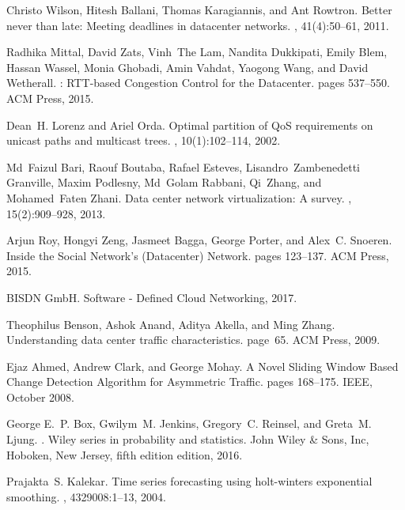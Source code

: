 \begin{thebibliography}{10}
Christo Wilson, Hitesh Ballani, Thomas Karagiannis, and Ant Rowtron.
\newblock Better never than late: {Meeting} deadlines in datacenter networks.
, 41(4):50--61, 2011.

Radhika Mittal, David Zats, Vinh~The Lam, Nandita Dukkipati, Emily Blem, Hassan
  Wassel, Monia Ghobadi, Amin Vahdat, Yaogong Wang, and David Wetherall.
: {RTT}-based {Congestion} {Control} for the {Datacenter}.
\newblock pages 537--550. ACM Press, 2015.

Dean~H. Lorenz and Ariel Orda.
\newblock Optimal partition of {QoS} requirements on unicast paths and
  multicast trees.
, 10(1):102--114, 2002.

Md~Faizul Bari, Raouf Boutaba, Rafael Esteves, Lisandro~Zambenedetti Granville,
  Maxim Podlesny, Md~Golam Rabbani, Qi~Zhang, and Mohamed~Faten Zhani.
\newblock Data center network virtualization: {A} survey.
, 15(2):909--928, 2013.

Arjun Roy, Hongyi Zeng, Jasmeet Bagga, George Porter, and Alex~C. Snoeren.
\newblock Inside the {Social} {Network}'s ({Datacenter}) {Network}.
\newblock pages 123--137. ACM Press, 2015.

{BISDN GmbH}.
\newblock Software - {Defined} {Cloud} {Networking}, 2017.

Theophilus Benson, Ashok Anand, Aditya Akella, and Ming Zhang.
\newblock Understanding data center traffic characteristics.
\newblock page~65. ACM Press, 2009.

Ejaz Ahmed, Andrew Clark, and George Mohay.
\newblock A {Novel} {Sliding} {Window} {Based} {Change} {Detection} {Algorithm}
  for {Asymmetric} {Traffic}.
\newblock pages 168--175. IEEE, October 2008.

George E.~P. Box, Gwilym~M. Jenkins, Gregory~C. Reinsel, and Greta~M. Ljung.
.
\newblock Wiley series in probability and statistics. John Wiley \& Sons, Inc,
  Hoboken, New Jersey, fifth edition edition, 2016.

Prajakta~S. Kalekar.
\newblock Time series forecasting using holt-winters exponential smoothing.
, 4329008:1--13,
  2004.


\end{thebibliography}
